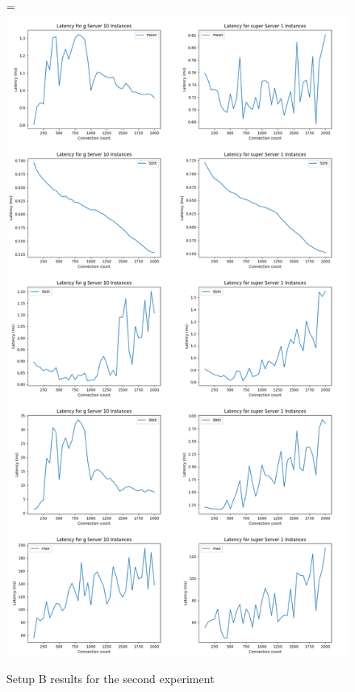 \documentclass[12pt,oneandhalf,chaparabic,ceng,ms,eng,oneside,pntc]{gsufbe}
\makeatletter
\let\old@includegraphics\includegraphics
\renewcommand{\includegraphics}[2][,]{%
  \setbox9=\hbox{\old@includegraphics[#1]{#2}}%
  \ifdim\wd9>\textwidth
    \old@includegraphics[#1,width=\textwidth]{#2}%
  \else
    \old@includegraphics[#1]{#2}%
  \fi%
}
\makeatother
\begin{document}
\begin{figure}
\centering
\includegraphics[]{1vs10.png}
\caption{Setup B results for the second experiment}
\label{fig:1vs10}
\end{figure}
\end{document}
